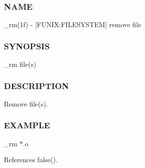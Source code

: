 \subsubsection*{N\+A\+ME}

\+\_\+rm(1f) -\/ \mbox{[}F\+U\+N\+IX\+:F\+I\+L\+E\+S\+Y\+S\+T\+EM\mbox{]} remove file \subsubsection*{S\+Y\+N\+O\+P\+S\+IS}

\+\_\+rm file(s) \subsubsection*{D\+E\+S\+C\+R\+I\+P\+T\+I\+ON}

Remove file(s). \subsubsection*{E\+X\+A\+M\+P\+LE}

\begin{DoxyVerb}  _rm *.o \end{DoxyVerb}
 

References false().

